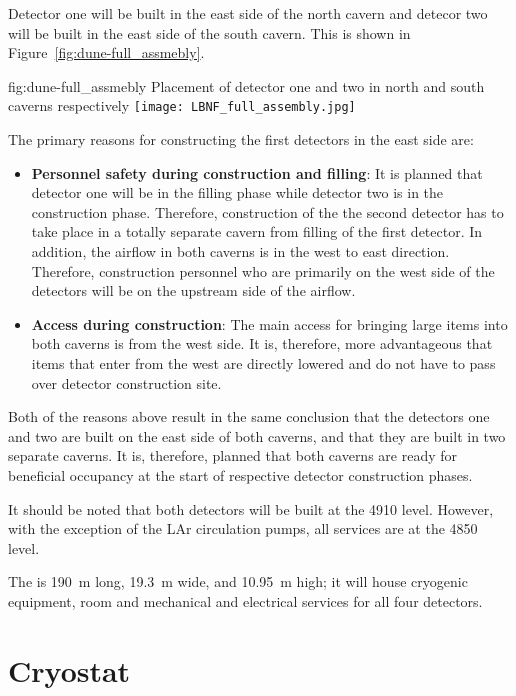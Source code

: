 Detector one will be built in the east side of the north cavern and
detecor two will be built in the east side of the south cavern. This
is shown in Figure~\ref{fig:dune-full_assmebly}.
\begin{dunefigure}{fig:dune-full_assmebly}
  {Placement of detector one and two in north and south caverns respectively}
  \texttt{[image: LBNF\_full\_assembly.jpg]}
\end{dunefigure}
The primary reasons for constructing the first detectors in the east side are:
\begin{itemize}
\item {\bf Personnel safety during construction and filling}: It is
  planned that detector one will be in the filling phase while detector
  two is in the construction phase. Therefore, construction of the the
  second detector has to take place in a totally separate cavern from
  filling of the first detector. In addition, the airflow in both
  caverns is in the west to east direction. Therefore, construction
  personnel who are primarily on the west side of the detectors will
  be on the upstream side of the airflow.
\item{\bf Access during construction}: The main access for bringing
  large items into both caverns is from the west side. It is,
  therefore, more advantageous that items that enter from the west are
  directly lowered and do not have to pass over detector construction
  site.
\end{itemize}
Both of the reasons above result in the same conclusion that the
detectors one and two are built on the east side of both caverns, and
that they are built in two separate caverns. It is, therefore, planned
that both caverns are ready for beneficial occupancy at the start of
respective detector construction phases.

It should be noted that both detectors will be built at the 4910
level. However, with the exception of the LAr circulation pumps, all
services are at the 4850 level.

The  is \SI{190}{\meter} long, \SI{19.3}{\meter}
wide, and \SI{10.95}{\meter} high; it will house cryogenic equipment, 
room and mechanical and electrical services for all four
detectors.

\section{Cryostat}
\label{sec:fdsp-coord-cryostat}

